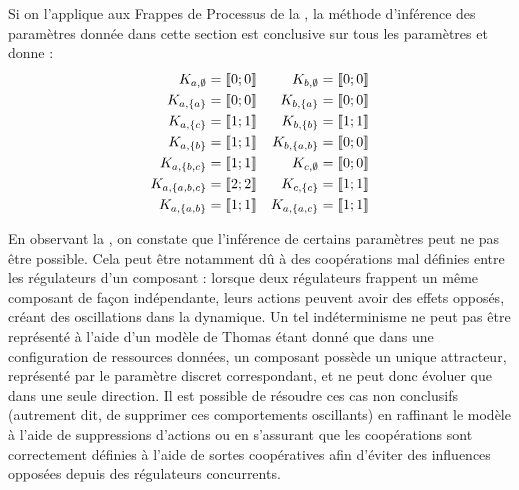 \begin{example}
  Si on l'applique aux Frappes de Processus de la ,
  la méthode d'inférence des paramètres donnée dans cette section est conclusive sur tous
  les paramètres et donne :
  \begin{align*}
    K_{a, \emptyset} &= \mathopen{\llbracket}0\mathclose{};0\mathclose{\rrbracket} &
    K_{b, \emptyset} &= \mathopen{\llbracket}0\mathclose{};0\mathclose{\rrbracket} \\
    K_{a, \{a\}} &= \mathopen{\llbracket}0\mathclose{};0\mathclose{\rrbracket} &
    K_{b, \{a\}} &= \mathopen{\llbracket}0\mathclose{};0\mathclose{\rrbracket} \\
    K_{a, \{c\}} &= \mathopen{\llbracket}1\mathclose{};1\mathclose{\rrbracket} &
    K_{b, \{b\}} &= \mathopen{\llbracket}1\mathclose{};1\mathclose{\rrbracket} \\
    K_{a, \{b\}} &= \mathopen{\llbracket}1\mathclose{};1\mathclose{\rrbracket} &
    K_{b, \{a,b\}} &= \mathopen{\llbracket}0\mathclose{};0\mathclose{\rrbracket} \\
    K_{a, \{b,c\}} &= \mathopen{\llbracket}1\mathclose{};1\mathclose{\rrbracket} &
    K_{c, \emptyset} &= \mathopen{\llbracket}0\mathclose{};0\mathclose{\rrbracket} \\
    K_{a, \{a,b,c\}} &= \mathopen{\llbracket}2\mathclose{};2\mathclose{\rrbracket} &
    K_{c, \{c\}} &= \mathopen{\llbracket}1\mathclose{};1\mathclose{\rrbracket} \\
    K_{a,\{a,b\}} &= \mathopen{\llbracket}1\mathclose{};1\mathclose{\rrbracket} &
    K_{a,\{a,c\}} &= \mathopen{\llbracket}1\mathclose{};1\mathclose{\rrbracket}
  \end{align*}
\end{example}


En observant la , on constate que l'inférence
de certains paramètres peut ne pas être possible.
Cela peut être notamment dû à des coopérations mal définies entre les régulateurs d'un composant :
lorsque deux régulateurs frappent un même composant de façon indépendante, leurs actions peuvent
avoir des effets opposés, créant des oscillations dans la dynamique.
Un tel indéterminisme ne peut pas être représenté à l'aide d'un modèle de Thomas étant donné
que dans une configuration de ressources données, un composant possède un unique attracteur,
représenté par le paramètre discret correspondant,
et ne peut donc évoluer que dans une seule direction.
Il est possible de résoudre ces cas non conclusifs
(autrement dit, de supprimer ces comportements oscillants)
en raffinant le modèle à l'aide de suppressions d'actions ou
en s'assurant que les coopérations sont correctement définies à l'aide de sortes coopératives
afin d'éviter des influences opposées depuis des régulateurs concurrents.



